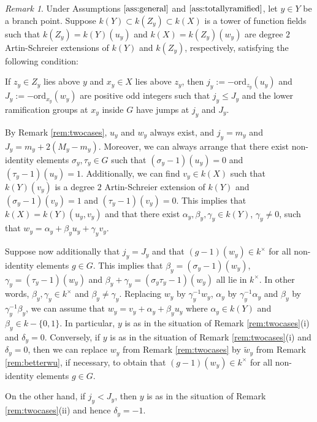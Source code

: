 \documentclass{amsart}
\numberwithin{equation}{section}
\numberwithin{table}{section}
\theoremstyle{plain}
\theoremstyle{definition}
\theoremstyle{remark}
\newtheorem{remark}[theorem]{Remark}
\begin{document}
\begin{remark}
\label{rem:awkward1follows}
Under Assumptions $\ref{ass:general}$ and $\ref{ass:totallyramified}$, let $y\in Y$ be a branch point. 
Suppose $k(Y)\subset k(Z_y) \subset k(X)$ is a tower of function fields such that $k(Z_y) = k(Y)(u_y)$ and $k(X)=k(Z_y)(w_y)$ are degree $2$ Artin-Schreier extensions of $k(Y)$ and $k(Z_y)$, respectively, satisfying the following condition:

If $z_y\in Z_y$ lies above $y$ and $x_y\in X$ lies above $z_y$, then $j_y:=-\mathrm{ord}_{z_y}(u_y)$ and $J_y:=-\mathrm{ord}_{x_y}(w_y)$ are positive odd integers such that $j_y\le J_y$ and the lower ramification groups at $x_y$ inside $G$ have jumps at $j_y$ and $J_y$.

By Remark \ref{rem:twocases}, $u_y$ and $w_y$ always exist, and $j_y=m_y$ and $J_y=m_y+2(M_y-m_y)$. Moreover, we can always arrange that there exist non-identity elements $\sigma_y,\tau_y\in G$ such that $(\sigma_y-1)(u_y)=0$ and $(\tau_y-1)(u_y)=1$. Additionally, we can find $v_y\in k(X)$ such that $k(Y)(v_y)$ is a degree $2$ Artin-Schreier extension of $k(Y)$ and $(\sigma_y-1)(v_y)=1$ and $(\tau_y-1)(v_y)=0$. This implies that $k(X)=k(Y)(u_y,v_y)$ and that there exist $\alpha_y,\beta_y,\gamma_y \in k(Y)$, $\gamma_y\ne 0$, such that $w_y=\alpha_y + \beta_y u_y + \gamma_y v_y$. 

Suppose now additionally that $j_y=J_y$ and that $(g-1)(w_y)\in k^\times$ for all non-identity elements $g \in G$. This implies that $\beta_y=(\sigma_y-1)(w_y)$, $\gamma_y=(\tau_y-1)(w_y)$ and $\beta_y+\gamma_y=(\sigma_y\tau_y-1)(w_y)$ all lie in $k^\times$. In other words, $\beta_y,\gamma_y\in k^\times$ and $\beta_y\ne \gamma_y$. Replacing $w_y$ by $\gamma_y^{-1}w_y$, $\alpha_y$ by $\gamma_y^{-1}\alpha_y$ and $\beta_y$ by $\gamma_y^{-1}\beta_y$, we can assume that $w_y=v_y+\alpha_y + \beta_y u_y$ where $\alpha_y\in k(Y)$ and $\beta_y\in k-\{0,1\}$. In particular, $y$ is as in the situation of Remark \ref{rem:twocases}(i) and $\delta_y=0$. Conversely, if $y$ is as in the situation of Remark \ref{rem:twocases}(i) and $\delta_y=0$, then we can replace $w_y$ from Remark \ref{rem:twocases} by $\widetilde{w}_y$ from Remark \ref{rem:betterwu}, if necessary, to obtain that $(g-1)(w_y)\in k^\times$ for all non-identity elements $g \in G$. 

On the other hand, if $j_y<J_y$, then $y$ is as in the situation of Remark \ref{rem:twocases}(ii) and hence  $\delta_y=-1$.
\end{remark}
\end{document}
